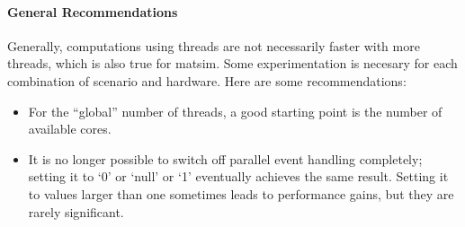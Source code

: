 
\paragraph{General Recommendations}

Generally, computations using threads are not necessarily faster with more threads, which is also true for \gls{matsim}. Some experimentation is necesary for each combination of scenario and hardware.  Here are some recommendations:
\begin{itemize}\styleItemize

\item For the ``global'' number of threads, a good starting point is the number of available cores.

\item It is no longer possible to switch off parallel event handling completely; setting it to `0' or `null' or `1' eventually achieves the same result.  Setting it to values larger than one sometimes leads to performance gains, but they are rarely significant.


\end{itemize}
